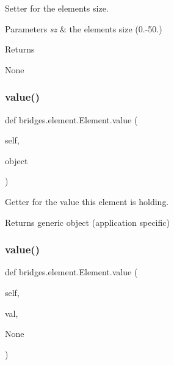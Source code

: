 Setter for the element\textquotesingle{}s size. 


\begin{DoxyParams}{Parameters}
{\em sz} & the element\textquotesingle{}s size (0.-\/50.) \\
\hline
\end{DoxyParams}
\begin{DoxyReturn}{Returns}


None 
\end{DoxyReturn}
\mbox{\label{classbridges_1_1element_1_1_element_ab89d51b751ad0956d7ec855c35335ad2}} 
\subsubsection{\texorpdfstring{value()}{value()}\hspace{0.1cm}{\footnotesize\ttfamily [1/2]}}
{\footnotesize\ttfamily def bridges.\+element.\+Element.\+value (\begin{DoxyParamCaption}\item[{}]{self,  }\item[{}]{object }\end{DoxyParamCaption})}



Getter for the value this element is holding. 

\begin{DoxyReturn}{Returns}
generic object (application specific) 
\end{DoxyReturn}
\mbox{\label{classbridges_1_1element_1_1_element_a810c122a8b900f476601d565291bdbf8}} 
\subsubsection{\texorpdfstring{value()}{value()}\hspace{0.1cm}{\footnotesize\ttfamily [2/2]}}
{\footnotesize\ttfamily def bridges.\+element.\+Element.\+value (\begin{DoxyParamCaption}\item[{}]{self,  }\item[{}]{val,  }\item[{}]{None }\end{DoxyParamCaption})}



